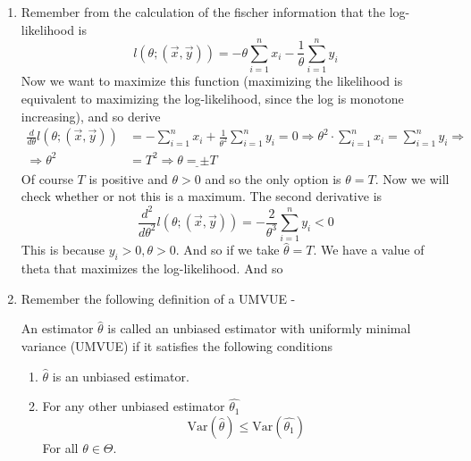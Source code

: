 \documentclass[../main.tex]{subfiles}
\begin{document}
\begin{enumerate}
    \item Remember from the calculation of the fischer information that
    the log-likelihood is
    \[l\left(\theta;\left(\overrightarrow{x}, \overrightarrow{y}\right)\right) = -\theta\sum_{i=1}^n x_i-\frac{1}{\theta}\sum_{i=1}^n y_i\]
    Now we want to maximize this function (maximizing the likelihood is equivalent to maximizing the log-likelihood, since the log is monotone increasing), and so derive 
    \begin{align*}\frac{d}{d\theta} l(\theta;\left(\overrightarrow{x},\overrightarrow{y}\right)) &= -\sum_{i=1}^n x_i +\frac{1}{\theta^2}\sum_{i=1}^n y_i = 0 \Longrightarrow \theta^2\cdot \sum_{i=1}^n x_i = \sum_{i=1}^n y_i\Longrightarrow \\
    \Longrightarrow\theta^2 &= T^2 \Longrightarrow \underline{\theta = \pm T}
    \end{align*}
    Of course $T$ is positive and $\theta>0$ and so the only option is $\theta = T$. Now we will check whether or not this is a maximum. The second derivative is
    \[\frac{d^2}{d\theta^2} l(\theta;\left(\overrightarrow{x},\overrightarrow{y}\right)) = -\frac{2}{\theta^3}\sum_{i=1}^n y_i<0\]
    This is because $y_i>0,\theta>0$. And so if we take $\hat{\theta} = T$. We have a value of theta that maximizes the log-likelihood. And so \,\qedsymbol 
    
    \item Remember the following definition of a UMVUE - 
    
    \begin{mdframed}[backgroundcolor=blue!20] 
        \begin{definition} An estimator $\hat{\theta}$ is called an unbiased estimator with uniformly minimal variance (UMVUE) if it satisfies the following conditions
        \begin{enumerate}
            
            \item  $\hat{\theta}$ is an unbiased estimator.
            
            \item For any other unbiased estimator $\hat{\theta_1}$ 
        \[\text{Var}(\hat{\theta})\leq\text{Var}(\hat{\theta_1})\]
        For all $\theta\in\Theta$.
            
        \end{enumerate}
        \end{definition}
    \end{mdframed}
    

\end{enumerate}
\end{document}
